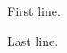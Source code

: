 \documentclass[a4paper,oneside,11pt]{article}
\begin{document}
First line.





Last line.
\end{document}
